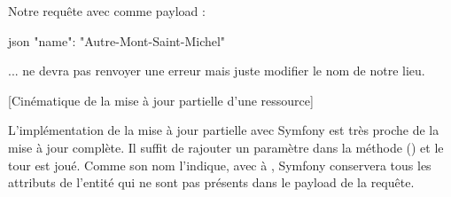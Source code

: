 \documentclass[big]{zmdocument}
\begin{document}
Notre requête avec comme payload :



\begin{CodeBlock}{json}
{
    "name": "Autre-Mont-Saint-Michel"
}
\end{CodeBlock}



... ne devra pas renvoyer une erreur mais juste modifier le nom de notre lieu.



[Cinématique de la mise à jour partielle d'une ressource]




L'implémentation de la mise à jour partielle avec Symfony est très proche de la mise à jour complète. Il suffit de rajouter un paramètre dans la méthode  () et le tour est joué.
Comme son nom l'indique, avec  à , Symfony conservera tous les attributs de l'entité  qui ne sont pas présents dans le payload de la requête.
\end{document}
